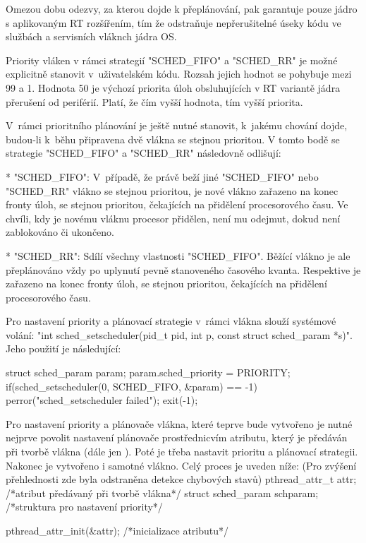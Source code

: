 Omezou dobu odezvy, za kterou dojde k přeplánování, pak garantuje pouze jádro s aplikovaným RT rozšířením, tím že odstraňuje nepřerušitelné úseky kódu ve službách a servisních vláknch jádra OS.

Priority vláken v rámci strategií "SCHED_FIFO" a "SCHED_RR" je možné explicitně stanovit v~uživatelském kódu. Rozsah jejich hodnot se pohybuje mezi 99 a 1. Hodnota 50 je výchozí priorita úloh obsluhujících v RT variantě jádra přerušení od periférií. Platí, že čím vyšší hodnota, tím vyšší priorita. 

V~rámci prioritního plánování je ještě nutné stanovit, k~jakému chování dojde, budou-li k~běhu připravena dvě vlákna se stejnou prioritou. V tomto bodě se strategie "SCHED_FIFO" a "SCHED_RR" následovně odlišují: 


\begitems 

* "SCHED_FIFO":  V~případě, že právě beží jiné "SCHED_FIFO" nebo "SCHED_RR" vlákno se stejnou prioritou, je nové vlákno zařazeno na konec fronty úloh, se stejnou prioritou, čekajících na přidělení procesorového času. Ve chvíli, kdy je novému vláknu procesor přidělen, není mu odejmut, dokud není zablokováno či ukončeno. 

* "SCHED_RR": Sdílí všechny vlastnosti "SCHED_FIFO". Běžící vlákno je ale přeplánováno vždy po uplynutí pevně stanoveného časového kvanta. Respektive je zařazeno na konec fronty úloh, se stejnou prioritou, čekajících na přidělení procesorového času.
\enditems

Pro nastavení priority a plánovací strategie v~rámci vlákna slouží systémové volání: "int sched_setscheduler(pid_t pid, int p, const struct sched_param *s)". Jeho použití je následující:

\begtt
struct sched_param param;
param.sched_priority = PRIORITY;
if(sched_setscheduler(0, SCHED_FIFO, &param) == -1) {
     perror("sched_setscheduler failed");
     exit(-1);
}\endtt

Pro nastavení priority a plánovače vlákna, které teprve bude vytvořeno je nutné nejprve povolit nastavení plánovače prostřednicvím atributu, který je předáván při tvorbě vlákna (dále jen ). Poté je třeba nastavit prioritu a plánovací strategii. Nakonec je vytvořeno i samotné vlákno. Celý proces je uveden níže: (Pro zvýšení přehlednosti zde byla odstraněna detekce chybových stavů)
\begtt
	pthread_attr_t attr; 	       /*atribut předávaný při tvorbě vlákna*/
	struct sched_param schparam;	/*struktura pro nastavení priority*/

	pthread_attr_init(&attr);    /*inicializace atributu*/
	
